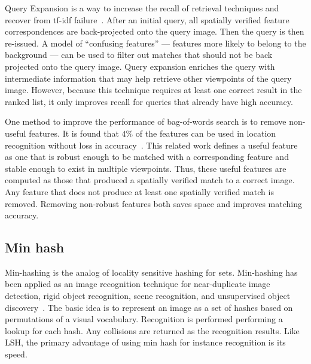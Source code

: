             Query Expansion is a way to increase the recall of
              retrieval techniques and recover from tf-idf
              failure~\cite{chum_total_2007, chum_total_2011,
              arandjelovic_three_2012, tolias_visual_2014}.
            After an initial query, all spatially verified feature
              correspondences are back-projected onto the query image.
            Then the query is then re-issued.
            A model of ``confusing features'' --- features more likely
              to belong to the background --- can be used to filter out
              matches that should not be back projected onto the query
              image.
            Query expansion enriches the query with intermediate
              information that may help retrieve other viewpoints of the
              query image.
            However, because this technique requires at least one
              correct result in the ranked list, it only improves recall
              for queries that already have high accuracy.

            One method to improve the performance of bag-of-words
              search is to remove non-useful features.
            It is found that $4\percent$ of the features can be used in
              location recognition without loss in
              accuracy~\cite{turcot_better_2009}.
            This related work defines a useful feature as one that is
              robust enough to be matched with a corresponding feature
              and stable enough to exist in multiple viewpoints.
            Thus, these useful features are computed as those that
              produced a spatially verified match to a correct image.
            Any feature that does not produce at least one spatially
              verified match is removed.
            Removing non-robust features both saves space and improves
              matching accuracy.

    \subsection{Min hash}

        Min-hashing is the analog of locality sensitive hashing for
          sets.
        Min-hashing has been applied as an image recognition technique
          for near-duplicate image detection, rigid object recognition,
          scene recognition, and unsupervised object
          discovery~\cite{chum_near_2008, zhang_image_2011,
          romberg_robust_2012, romberg_bundle_2013, chum_geometric_2009,
          chum_largescale_2010, chum_fast_2012,
          wang_semisupervised_2012}.
        The basic idea is to represent an image as a set of hashes
          based on permutations of a visual vocabulary.
        Recognition is performed performing a lookup for each hash.
        Any collisions are returned as the recognition results.
        Like LSH, the primary advantage of using min hash for instance
          recognition is its speed.


